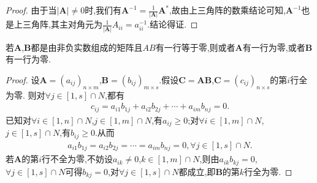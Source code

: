 \documentclass[../../main.tex]{subfiles}
\begin{document}
\begin{proof}
由于当$\left| \boldsymbol{A} \right|\ne 0$时,我们有$\boldsymbol{A}^{-1}=\frac{1}{\left| \boldsymbol{A} \right|}\boldsymbol{A}^*$,故由上三角阵的数乘结论可知,$\boldsymbol{A}^{-1}$也是上三角阵,其主对角元为$\frac{1}{\left| \boldsymbol{A} \right|}A_{ii}=a_{ii}^{-1}$.结论得证.
\end{proof}

\begin{proposition}
若\(\boldsymbol{A}\),\(\boldsymbol{B}\)都是由非负实数组成的矩阵且\(AB\)有一行等于零,则或者\(\boldsymbol{A}\)有一行为零,或者\(\boldsymbol{B}\)有一行为零.
\end{proposition}
\begin{proof}
设\(\boldsymbol{A} = (a_{ij})_{n\times m}\),\(\boldsymbol{B} = (b_{ij})_{m\times s}\).假设\(\boldsymbol{C} = \boldsymbol{AB}\),\(\boldsymbol{C} = (c_{ij})_{n\times s}\)的第\(i\)行全为零.
则对\(\forall j\in [1,s]\cap N\),都有
\begin{align*}
c_{ij} = a_{i1}b_{1j} + a_{i2}b_{2j} + \cdots + a_{im}b_{nj} = 0 .
\end{align*}
已知对\(\forall i\in [1,n]\cap N\),\(j\in [1,m]\cap N\),有\(a_{ij} \geq 0\);对\(\forall i\in [1,m]\cap N\),\(j\in [1,s]\cap N\),有\(b_{ij} \geq 0\).从而
\begin{align*}
a_{i1}b_{1j} = a_{i2}b_{2j} = \cdots = a_{im}b_{nj} = 0,\forall j\in [1,s]\cap N.
\end{align*}
若\(\boldsymbol{A}\)的第\(i\)行不全为零,不妨设\(a_{ik} \neq 0\),\(k\in [1,m]\cap N\),则由\(a_{ik}b_{kj} = 0\),\(\forall j\in [1,s]\cap N\)可得\(b_{kj} = 0\),对\(\forall j\in [1,s]\cap N\)都成立,即\(\boldsymbol{B}\)的第\(k\)行全为零. 
\end{proof}
\end{document}
